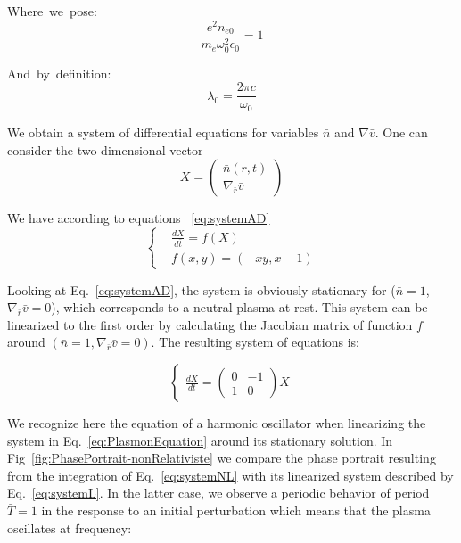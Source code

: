 \begin{multicols}{2}
\mbox{Where we pose:}
$$
\frac{e^2 n_{e0}}{m_e\omega_0^2 \epsilon_0} = 1 
$$

\mbox{And by definition:}
$$
\lambda_0= \frac{2 \pi c}{\omega_0}
$$
\end{multicols}

\noindent We obtain a system of differential equations for variables $\bar{n}$ and $\nabla \bar{v}$. One can consider the two-dimensional vector 
$$
X = 
 \left( \begin{array}{c}
\bar{n}(r,t) \\
\nabla_{\bar{r}} \bar{v} \end{array} \right)
$$

\noindent We have according to equations ~\ref{eq:systemAD}
\begin{equation}
  \left\{
      \begin{aligned}
     & \frac{d X}{d\bar{t}} = f(X) \\
     & f(x,y) = (-x y, x-1)
      \end{aligned}
    \right.
    \label{eq:systemNL}
\end{equation}

\noindent Looking at Eq.~\ref{eq:systemAD}, the system is obviously stationary for ($\bar{n} = 1$, $\nabla_{\bar{r}} \bar{v} = 0$), which corresponds to a neutral plasma at rest.
This system can be linearized to the first order by calculating the Jacobian matrix of function $f$ around $(\bar{n} = 1 , \nabla_{\bar{r}} \bar{v} = 0)$. The resulting system of equations is:

\begin{equation}
  \left\{
      \begin{aligned}
     \frac{dX}{dt} = 
 \left( \begin{array}{cc}
0 & -1\\
1 &  0  \end{array} \right)X
      \end{aligned}
    \right.
\label{eq:systemL}
\end{equation}

\noindent We recognize here the equation of a harmonic oscillator \cite{thaury2010high,chen1985acceleration} when linearizing the system in Eq.~\ref{eq:PlasmonEquation} around its stationary solution. In Fig~\ref{fig:PhasePortrait-nonRelativiste} we compare the phase portrait resulting from the integration of Eq.~\ref{eq:systemNL} with its linearized system described by Eq.~\ref{eq:systemL}. In the latter case, we observe a periodic behavior of period $\bar{T} = 1$ in the response to an initial perturbation which means that the plasma oscillates at frequency:


